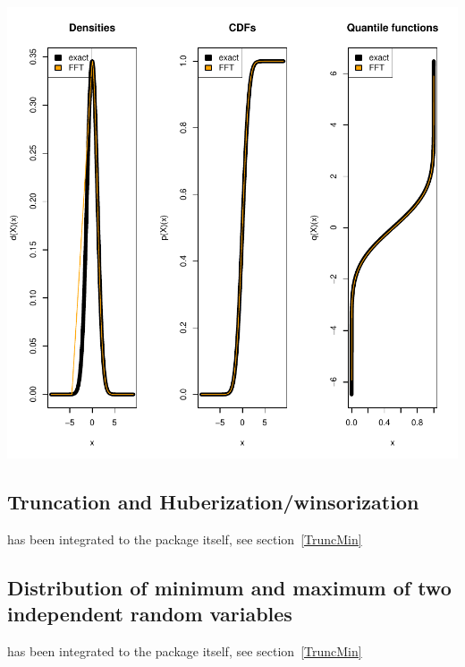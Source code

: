 \documentclass[11pt]{article}
\begin{document}
\begin{Schunk}
\end{Schunk}
\includegraphics{distr-StationaryRegressorDistr}
\subsection{Truncation and Huberization/winsorization}\label{truncex}
has been integrated to the package itself, see section~\ref{TruncMin}
\subsection{Distribution of minimum and maximum of two independent random variables}\label{minmaxex}
has been integrated to the package itself, see section~\ref{TruncMin}

\end{document}
\end{Sinput}
\end{Schunk}
\end{document}
